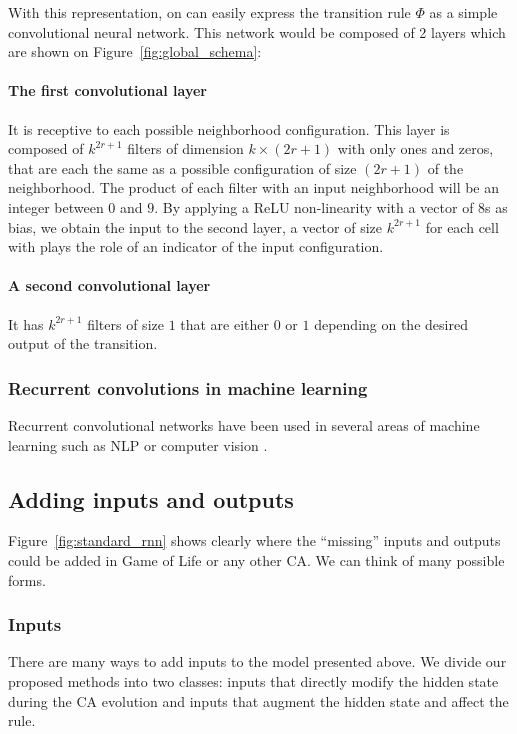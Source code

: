 With this representation, on can easily express the transition rule $\Phi$ as a
simple convolutional neural network. This network would be composed of 2 layers
which are shown on Figure~\ref{fig:global_schema}:

\paragraph{The first convolutional layer}It is receptive to each possible
neighborhood configuration. This layer is composed of $k^{2r + 1}$ filters of
dimension $k\times (2r + 1)$ with only ones and zeros, that are each the same as
a possible configuration of size $(2r+1)$ of the neighborhood. The product of
each filter with an input neighborhood will be an integer between $0$ and $9$.
By applying a ReLU non-linearity with a vector of 8s as bias, we obtain the
input to the second layer, a vector of size $k^{2r + 1}$ for each cell with
plays the role of an indicator of the input configuration.

\paragraph{A second convolutional layer} It has $k^{2r + 1}$ filters of size $1$ that
are either $0$ or $1$ depending on the desired output of the transition.

\subsubsection{Recurrent convolutions in machine learning}

Recurrent convolutional networks have been used in several areas of machine
learning such as NLP or computer vision
\parencite{pinheiroRecurrentConvolutionalNeural2014,
  laiRecurrentConvolutionalNeural2015}.

\subsection{Adding inputs and outputs\label{sec:adding-inputs-outp}}

Figure~\ref{fig:standard_rnn} shows clearly where the ``missing'' inputs and
outputs could be added in Game of Life or any other CA\@. We can think of many
possible forms.

\subsubsection{Inputs}
There are many ways to add inputs to the model presented above. We divide our
proposed methods into two classes: inputs that directly modify the hidden state
during the CA evolution and inputs that augment the hidden state and affect the
rule.

